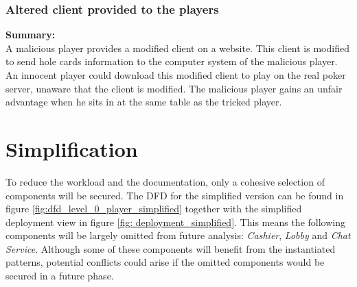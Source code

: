 \documentclass[a4paper,11pt]{report}
\begin{document}
\subsubsection{Altered client provided to the players}
\textbf{Summary:} \\
A malicious player provides a modified client on a website. This client is modified to send hole cards information to the computer system of the malicious player. An innocent player could download this modified client to play on the real poker server, unaware that the client is modified. The malicious player gains an unfair advantage when he sits in at the same table as the tricked player.

\section{Simplification}
To reduce the workload and the documentation, only a cohesive selection of components will be secured. The DFD for the simplified version can be found in figure \ref{fig:dfd_level_0_player_simplified} together with the simplified deployment view in figure \ref{fig: deployment_simplified}.
This means the following components will be largely omitted from future analysis: \textit{Cashier}, \textit{Lobby} and \textit{Chat Service}. Although some of these components will benefit from the instantiated patterns, potential conflicts could arise if the omitted components would be secured in a future phase.
\end{document}
